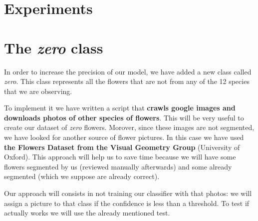 \documentclass[11]{article}
\begin{document}
\section{Experiments}

\section{The \textit{zero} class}

In order to increase the precision of our model, we have added a new class called \textit{zero}. This class represents all the flowers that are not from any of the 12 species that we are observing.
\medskip

To implement it we have written a script that \textbf{crawls google images and downloads photos of other species of flowers}. This will be very useful to create our dataset of \textit{zero} flowers. Morover, since these images are not segmented, we have looked for another source of flower pictures. In this case we have used \textbf{the Flowers Dataset from the Visual Geometry Group} (University of Oxford). This approach will help us to save time because we will have some flowers segmented by us (reviewed manually afterwards) and some already segmented (which we suppose are already correct).
\medskip

Our approach will consists in not training our classifier with that photos: we will assign a picture to that class if the confidence is less than a threshold. To test if actually works we will use the already mentioned test. 
\end{document}
